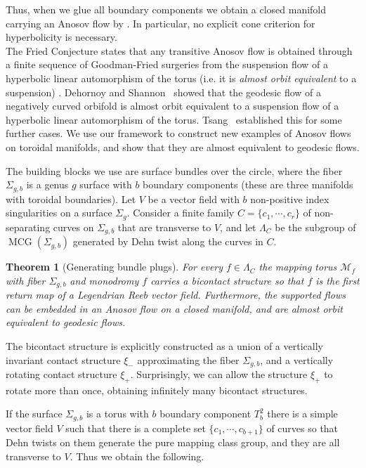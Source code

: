 \documentclass{amsart}
\newtheorem{theorem}{Theorem}[section]
\theoremstyle{definition}
\theoremstyle{remark}
\DeclareMathOperator{\MCG}{MCG}
\begin{document}
Thus, when we glue all boundary components we obtain a closed manifold carrying an Anosov flow by \cite{Hoz5}.
In particular, no explicit cone criterion for hyperbolicity is necessary.\\

The Fried Conjecture states that any transitive Anosov flow is obtained through a finite sequence of Goodman-Fried surgeries from the suspension flow of a hyperbolic linear automorphism of the torus (i.e. it is {\it almost orbit equivalent} to a suspension) \cite{Fri}.
Dehornoy and Shannon~\cite{DeSh19} showed that the geodesic flow of a negatively curved orbifold is almost orbit equivalent to a suspension flow of a hyperbolic linear automorphism of the torus. 
Tsang~\cite{Tsang24} established this for some further cases. We use our framework to construct new examples of Anosov flows on toroidal manifolds, and show that they are almost equivalent to geodesic flows. 

The building blocks we use are surface bundles over the circle, where the fiber $\Sigma_{g,b}$ is a genus $g$ surface with $b$ boundary components (these are three manifolds with toroidal boundaries).
Let $V$ be a vector field with $b$ non-positive index singularities on a surface $\Sigma_g$. Consider a finite family $C=\{c_1,\cdots ,c_r\}$ of non-separating curves on $\Sigma_{g,b}$ that are transverse to $V$, and let $\Lambda_C$ be the subgroup  of $\MCG(\Sigma_{g,b})$ generated by Dehn twist along the curves in $C$.


\begin{theorem}[Generating bundle plugs]\label{thm:bundle plugs}
For every $f\in \Lambda_C$ the mapping torus $\mathcal{M}_f$ with fiber $\Sigma_{g,b}$ and monodromy $f$ carries a bicontact structure so that $f$ is the first return map of a Legendrian Reeb vector field. Furthermore, the supported flows can be embedded in an Anosov flow on a closed manifold, and are almost orbit equivalent to geodesic flows.
\end{theorem}

The bicontact structure is  explicitly constructed as a union of a vertically invariant contact structure $\xi_-$ approximating the fiber $\Sigma_{g,b}$, and a vertically rotating contact structure $\xi_+$. Surprisingly, we can allow the structure $\xi_+$ to rotate more than once, obtaining infinitely many bicontact structures.

If the surface $\Sigma_{g,b}$ is a torus with $b$ boundary component $T^2_b$ there is a simple vector field $V$ such that there is a complete set $\{c_1,\cdots, c_{b+1}\}$ of curves so that Dehn twists on them generate the pure mapping class group, and they are all transverse to $V$. Thus we obtain the following.
\end{document}
